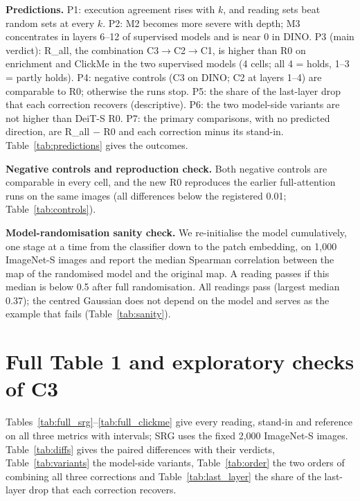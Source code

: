 \textbf{Predictions.} P1: execution agreement rises with $k$, and reading sets beat random sets at every $k$. P2: M2 becomes more severe with depth; M3 concentrates in layers 6--12 of supervised models and is near 0 in DINO. P3 (main verdict): R\_all, the combination C3$\to$C2$\to$C1, is higher than R0 on enrichment and ClickMe in the two supervised models (4 cells; all 4 = holds, 1--3 = partly holds). P4: negative controls (C3 on DINO; C2 at layers 1--4) are comparable to R0; otherwise the runs stop. P5: the share of the last-layer drop that each correction recovers (descriptive). P6: the two model-side variants are not higher than DeiT-S R0. P7: the primary comparisons, with no predicted direction, are R\_all $-$ R0 and each correction minus its stand-in. Table~\ref{tab:predictions} gives the outcomes.



\textbf{Negative controls and reproduction check.} Both negative controls are comparable in every cell, and the new R0 reproduces the earlier full-attention runs on the same images (all differences below the registered 0.01; Table~\ref{tab:controls}).



\textbf{Model-randomisation sanity check.} We re-initialise the model cumulatively, one stage at a time from the classifier down to the patch embedding, \citep{adebayo2018} on 1,000 ImageNet-S images and report the median Spearman correlation between the map of the randomised model and the original map. A reading passes if this median is below 0.5 after full randomisation. All readings pass (largest median 0.37); the centred Gaussian does not depend on the model and serves as the example that fails (Table~\ref{tab:sanity}).



\FloatBarrier
\section{Full Table 1 and exploratory checks of C3}
\label{app:full}

Tables~\ref{tab:full_srg}--\ref{tab:full_clickme} give every reading, stand-in and reference on all three metrics with intervals; SRG uses the fixed 2,000 ImageNet-S images. Table~\ref{tab:diffs} gives the paired differences with their verdicts, Table~\ref{tab:variants} the model-side variants, Table~\ref{tab:order} the two orders of combining all three corrections and Table~\ref{tab:last_layer} the share of the last-layer drop that each correction recovers.


